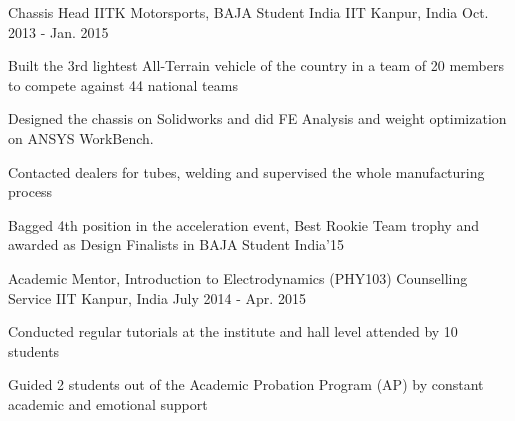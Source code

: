 

\begin{cventries}
	\cventry
	{Chassis Head} %
	{IITK Motorsports, BAJA Student India} %
	{IIT Kanpur, India} %
	{Oct. 2013 - Jan. 2015} %
	{
		\begin{cvitems} %
			\item {Built the 3rd lightest All-Terrain vehicle of the country in a team of 20 members to compete against 44 national teams}
			\item { Designed the chassis on Solidworks and did FE Analysis and weight optimization on ANSYS WorkBench.}
			\item {
				Contacted dealers for tubes, welding and supervised the whole manufacturing process
			}
			\item { Bagged 4th position in the acceleration event, Best Rookie Team trophy and awarded as Design Finalists in BAJA Student India’15 }
		\end{cvitems}
	}
  \cventry
    {Academic Mentor, Introduction to Electrodynamics (PHY103)} %
    {Counselling Service} %
    {IIT Kanpur, India} %
    {July 2014 - Apr. 2015} %
    {
      \begin{cvitems} %
		\item {Conducted regular tutorials at the institute and hall level attended by 10 students}
		\item {Guided 2 students out of the Academic Probation Program (AP) by constant academic and emotional support }
      \end{cvitems}
    }
  
  
\end{cventries}
